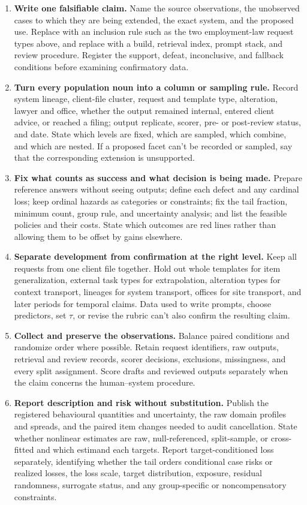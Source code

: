 \documentclass[12pt]{article}
\begin{document}
\begin{enumerate}
\item \textbf{Write one falsifiable claim.} Name the source observations, the unobserved cases to which they are being extended, the exact system, and the proposed use. Replace  with an inclusion rule such as the two employment-law request types above, and replace  with a build, retrieval index, prompt stack, and review procedure. Register the support, defeat, inconclusive, and fallback conditions before examining confirmatory data.
\item \textbf{Turn every population noun into a column or sampling rule.} Record system lineage, client-file cluster, request and template type, alteration, lawyer and office, whether the output remained internal, entered client advice, or reached a filing; output replicate, scorer, pre- or post-review status, and date. State which levels are fixed, which are sampled, which combine, and which are nested. If a proposed facet can't be recorded or sampled, say that the corresponding extension is unsupported.
\item \textbf{Fix what counts as success and what decision is being made.} Prepare reference answers without seeing outputs; define each defect and any cardinal loss; keep ordinal hazards as categories or constraints; fix the tail fraction, minimum count, group rule, and uncertainty analysis; and list the feasible policies and their costs. State which outcomes are red lines rather than allowing them to be offset by gains elsewhere.
\item \textbf{Separate development from confirmation at the right level.} Keep all requests from one client file together. Hold out whole templates for item generalization, external task types for extrapolation, alteration types for context transport, lineages for system transport, offices for site transport, and later periods for temporal claims. Data used to write prompts, choose predictors, set \(\tau\), or revise the rubric can't also confirm the resulting claim.
\item \textbf{Collect and preserve the observations.} Balance paired conditions and randomize order where possible. Retain request identifiers, raw outputs, retrieval and review records, scorer decisions, exclusions, missingness, and every split assignment. Score drafts and reviewed outputs separately when the claim concerns the human--system procedure.
\item \textbf{Report description and risk without substitution.} Publish the registered behavioural quantities and uncertainty, the raw domain profiles and spreads, and the paired item changes needed to audit cancellation. State whether nonlinear estimates are raw, null-referenced, split-sample, or cross-fitted and which estimand each targets. Report target-conditioned loss separately, identifying whether the tail orders conditional case risks or realized losses, the loss scale, target distribution, exposure, residual randomness, surrogate status, and any group-specific or noncompensatory constraints.

\end{enumerate}
\end{document}
